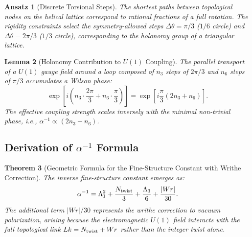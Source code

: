 \documentclass[12pt, a4paper]{article}
\newtheorem{theorem}{Theorem}[section]
\newtheorem{lemma}[theorem]{Lemma}
\newtheorem{ansatz}[theorem]{Ansatz}
\theoremstyle{definition}
\newcommand{\Tw}{N_{\rm twist}}
\begin{document}
\begin{ansatz}[Discrete Torsional Steps]
The shortest paths between topological nodes on the helical lattice correspond to rational fractions of a full rotation. The rigidity constraints select the symmetry-allowed steps $\Delta\theta = \pi/3$ ($1/6$ circle) and $\Delta\theta = 2\pi/3$ ($1/3$ circle), corresponding to the holonomy group of a triangular lattice.
\end{ansatz}

\begin{lemma}[Holonomy Contribution to $U(1)$ Coupling]
The parallel transport of a $U(1)$ gauge field around a loop composed of $n_3$ steps of $2\pi/3$ and $n_6$ steps of $\pi/3$ accumulates a Wilson phase:
\begin{equation}
\exp\!\left[i \left(n_3 \cdot \frac{2\pi}{3} + n_6 \cdot \frac{\pi}{3}\right)\right] = \exp\!\left[i \frac{\pi}{3}(2n_3 + n_6)\right].
\end{equation}
The effective coupling strength scales inversely with the minimal non-trivial phase, i.e., $\alpha^{-1} \propto (2n_3 + n_6)$.
\end{lemma}

\subsection{Derivation of $\alpha^{-1}$ Formula}
\begin{theorem}[Geometric Formula for the Fine-Structure Constant with Writhe Correction]
\label{thm:alpha-geom-refined}
The inverse fine-structure constant emerges as:
\begin{equation}
\alpha^{-1} = \Lambda_1^2 + \frac{\Tw}{3} + \frac{\Lambda_3}{6} + \frac{|Wr|}{30}.
\label{eq:alpha-geom-refined}
\end{equation}
The additional term $|Wr|/30$ represents the writhe correction to vacuum polarization, arising because the electromagnetic $U(1)$ field interacts with the full topological link $Lk = \Tw + Wr$ rather than the integer twist alone.
\end{theorem}
\end{document}
